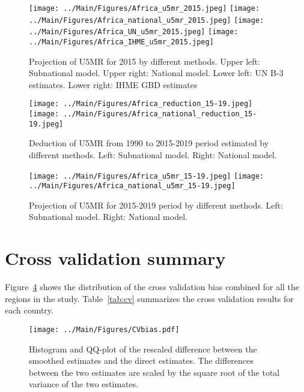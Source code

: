 \documentclass[12pt]{article}\usepackage[]{graphicx}\usepackage[]{color}
\begin{document}
\begin{figure}[htb]
\texttt{[image: ../Main/Figures/Africa\_u5mr\_2015.jpeg]}
\texttt{[image: ../Main/Figures/Africa\_national\_u5mr\_2015.jpeg]}
\texttt{[image: ../Main/Figures/Africa\_UN\_u5mr\_2015.jpeg]}
\texttt{[image: ../Main/Figures/Africa\_IHME\_u5mr\_2015.jpeg]}
\caption{Projection of U5MR for 2015 by different methods. Upper left: Subnational model. Upper right: National model. Lower left: UN B-3 estimates. Lower right: IHME GBD estimates}
\label{fig:c1-2}
\end{figure}


\begin{figure}[htb]
\texttt{[image: ../Main/Figures/Africa\_reduction\_15-19.jpeg]}
\texttt{[image: ../Main/Figures/Africa\_national\_reduction\_15-19.jpeg]}
\caption{Deduction of U5MR from 1990 to 2015-2019 period estimated by different methods. Left: Subnational model. Right: National model.}
\label{fig:c1-3}
\end{figure}

\begin{figure}[htb]
\texttt{[image: ../Main/Figures/Africa\_u5mr\_15-19.jpeg]}
\texttt{[image: ../Main/Figures/Africa\_national\_u5mr\_15-19.jpeg]}
\caption{Projection of U5MR for 2015-2019 period by different methods. Left: Subnational model. Right: National model.}
\label{fig:c1-4}
\end{figure}

\clearpage
\section{Cross validation summary}
Figure~\ref{fig:var} shows the distribution of the cross validation bias combined for all the regions in the study. Table~\ref{tab:cv} summarizes the cross validation results for each country.

\begin{figure}[htb]
\centering
\texttt{[image: ../Main/Figures/CVbias.pdf]}
\caption{Histogram and QQ-plot of the rescaled difference between the smoothed estimates and the direct estimates. The differences between the two estimates are scaled by the square root of the total variance of the two estimates.}
\label{fig:var}
\end{figure}
\end{document}
